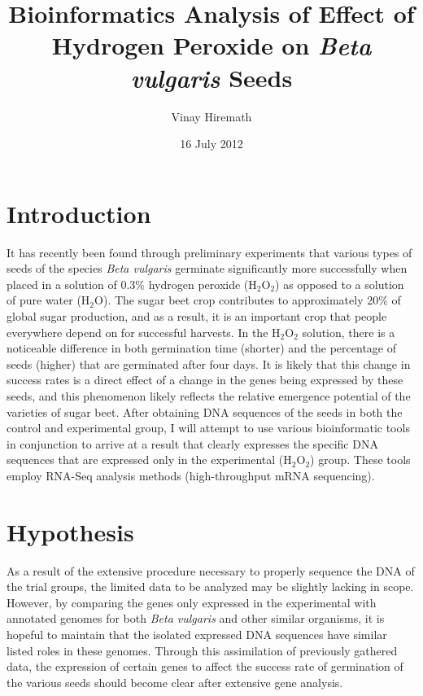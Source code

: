 \documentclass{article}
\begin{document}
\title{Bioinformatics Analysis of Effect of Hydrogen Peroxide on \emph{Beta vulgaris} Seeds}
\author{Vinay Hiremath}
\date{16 July 2012}
\maketitle
\section{Introduction}
	It has recently been found through preliminary experiments that various types of seeds of the species \emph{Beta vulgaris} germinate significantly more successfully when placed in a solution of 0.3\% hydrogen peroxide (H$_{2}$O$_{2}$) as opposed to a solution of pure water (H$_{2}$O). The sugar beet crop contributes to approximately 20\% of global sugar production, and as a result, it is an important crop that people everywhere depend on for successful harvests. In the H$_{2}$O$_{2}$ solution, there is a noticeable difference in both germination time (shorter) and the percentage of seeds (higher) that are germinated after four days. It is likely that this change in success rates is a direct effect of a change in the genes being expressed by these seeds, and this phenomenon likely reflects the relative emergence potential of the varieties of sugar beet. After obtaining DNA sequences of the seeds in both the control and experimental group, I will attempt to use various bioinformatic tools in conjunction to arrive at a result that clearly expresses the specific DNA sequences that are expressed only in the experimental (H$_{2}$O$_{2}$) group. These tools employ RNA-Seq analysis methods (high-throughput mRNA sequencing).
\section{Hypothesis}
	As a result of the extensive procedure necessary to properly sequence the DNA of the trial groups, the limited data to be analyzed may be slightly lacking in scope. However, by comparing the genes only expressed in the experimental with annotated genomes for both \emph{Beta vulgaris} and other similar organisms, it is hopeful to maintain that the isolated expressed DNA sequences have similar listed roles in these genomes. Through this assimilation of previously gathered data, the expression of certain genes to affect the success rate of germination of the various seeds should become clear after extensive gene analysis.
\end{document}
